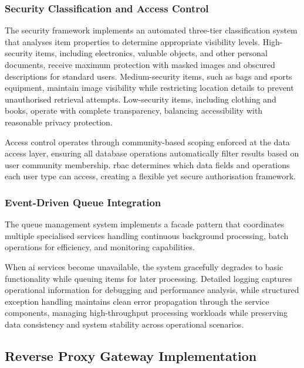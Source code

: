 \subsubsection{Security Classification and Access Control}

The security framework implements an automated three-tier classification system that analyses item properties to determine appropriate visibility levels. High-security items, including electronics, valuable objects, and other personal documents, receive maximum protection with masked images and obscured descriptions for standard users. Medium-security items, such as bags and sports equipment, maintain image visibility while restricting location details to prevent unauthorised retrieval attempts. Low-security items, including clothing and books, operate with complete transparency, balancing accessibility with reasonable privacy protection.

Access control operates through community-based scoping enforced at the data access layer, ensuring all database operations automatically filter results based on user community membership. \ac{rbac} determines which data fields and operations each user type can access, creating a flexible yet secure authorisation framework.

\subsubsection{Event-Driven Queue Integration}

The queue management system implements a facade pattern that coordinates multiple specialised services handling continuous background processing, batch operations for efficiency, and monitoring capabilities.

When \ac{ai} services become unavailable, the system gracefully degrades to basic functionality while queuing items for later processing. Detailed logging captures operational information for debugging and performance analysis, while structured exception handling maintains clean error propagation through the service components, managing high-throughput processing workloads while preserving data consistency and system stability across operational scenarios.

\subsection{Reverse Proxy Gateway Implementation} \label{subsection:reverse_proxy_gateway}

